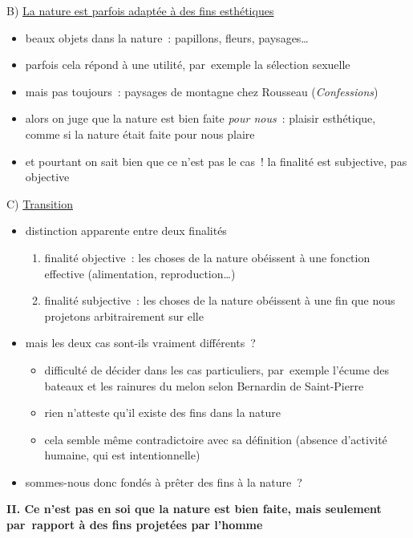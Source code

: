 \documentclass[a4paper,12pt]{article}
\begin{document}
\medskip

B) \uline{La nature est parfois adaptée à des fins esthétiques} 
\begin{itemize}
\item beaux objets dans la nature : papillons, fleurs, paysages\ldots{}
\item parfois cela répond à une utilité, par exemple la sélection sexuelle
\item mais pas toujours : paysages de montagne chez Rousseau (\emph{Confessions}​)
\item alors on juge que la nature est bien faite \emph{pour nous} : plaisir
esthétique, comme si la nature était faite pour nous plaire
\item et pourtant on sait bien que ce n'est pas le cas ! la finalité est
subjective, pas objective
\end{itemize}

\medskip

C) \uline{Transition}
\begin{itemize}
\item distinction apparente entre deux finalités
\begin{enumerate}
\item finalité objective : les choses de la nature obéissent à une
fonction effective (alimentation, reproduction\ldots{})
\item finalité subjective : les choses de la nature obéissent à une fin
que nous projetons arbitrairement sur elle
\end{enumerate}
\item mais les deux cas sont-ils vraiment différents ?
\begin{itemize}
\item difficulté de décider dans les cas particuliers, par exemple l'écume
des bateaux et les rainures du melon selon Bernardin de Saint-Pierre
\item rien n'atteste qu'il existe des fins dans la nature
\item cela semble même contradictoire avec sa définition (absence
d'activité humaine, qui est intentionnelle)
\end{itemize}
\item sommes-nous donc fondés à prêter des fins à la nature ?
\end{itemize}

\bigskip


\textbf{II. Ce n'est pas en soi que la nature est bien faite, mais seulement
par rapport à des fins projetées par l'homme}
\end{document}
